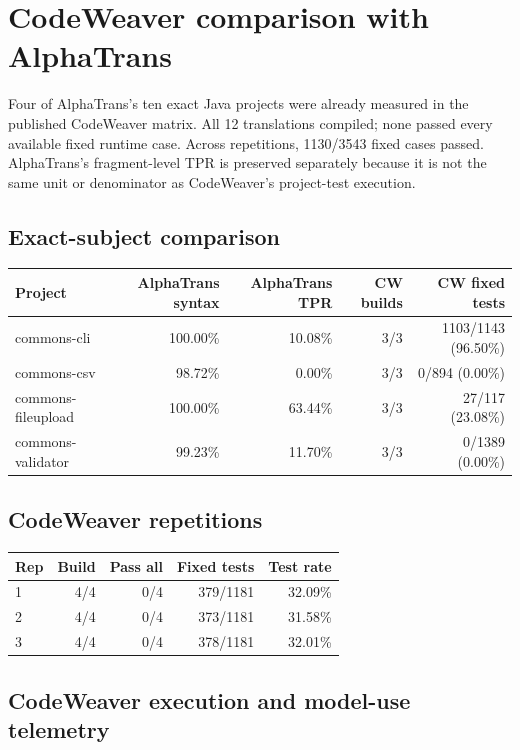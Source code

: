 \documentclass{article}
\begin{document}
\section*{CodeWeaver comparison with AlphaTrans}

Four of AlphaTrans's ten exact Java projects were already measured in the published CodeWeaver matrix. All 12 translations compiled; none passed every available fixed runtime case. Across repetitions, 1130/3543 fixed cases passed. AlphaTrans's fragment-level TPR is preserved separately because it is not the same unit or denominator as CodeWeaver's project-test execution.

\subsection*{Exact-subject comparison}

\begin{tabular}{lrrrr}
\toprule
Project & AlphaTrans syntax & AlphaTrans TPR & CW builds & CW fixed tests \\
\midrule
commons-cli & 100.00\% & 10.08\% & 3/3 & 1103/1143 (96.50\%) \\
commons-csv & 98.72\% & 0.00\% & 3/3 & 0/894 (0.00\%) \\
commons-fileupload & 100.00\% & 63.44\% & 3/3 & 27/117 (23.08\%) \\
commons-validator & 99.23\% & 11.70\% & 3/3 & 0/1389 (0.00\%) \\
\bottomrule
\end{tabular}

\subsection*{CodeWeaver repetitions}

\begin{tabular}{lrrrr}
\toprule
Rep & Build & Pass all & Fixed tests & Test rate \\
\midrule
1 & 4/4 & 0/4 & 379/1181 & 32.09\% \\
2 & 4/4 & 0/4 & 373/1181 & 31.58\% \\
3 & 4/4 & 0/4 & 378/1181 & 32.01\% \\
\bottomrule
\end{tabular}

\subsection*{CodeWeaver execution and model-use telemetry}
\end{document}
